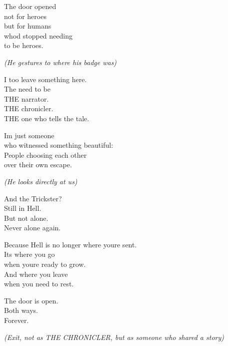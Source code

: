 The door opened\\
not for heroes\\
but for humans\\
who\textquotesingle d stopped needing\\
to be heroes.

\emph{(He gestures to where his badge was)}

I too leave something here.\\
The need to be\\
THE narrator.\\
THE chronicler.\\
THE one who tells the tale.

I\textquotesingle m just someone\\
who witnessed something beautiful:\\
People choosing each other\\
over their own escape.

\emph{(He looks directly at us)}

And the Trickster?\\
Still in Hell.\\
But not alone.\\
Never alone again.

Because Hell is no longer where you\textquotesingle re sent.\\
It\textquotesingle s where you go\\
when you\textquotesingle re ready to grow.\\
And where you leave\\
when you need to rest.

The door is open.\\
Both ways.\\
Forever.

\emph{(Exit, not as THE CHRONICLER, but as someone who shared a story)}

\bookdivider
